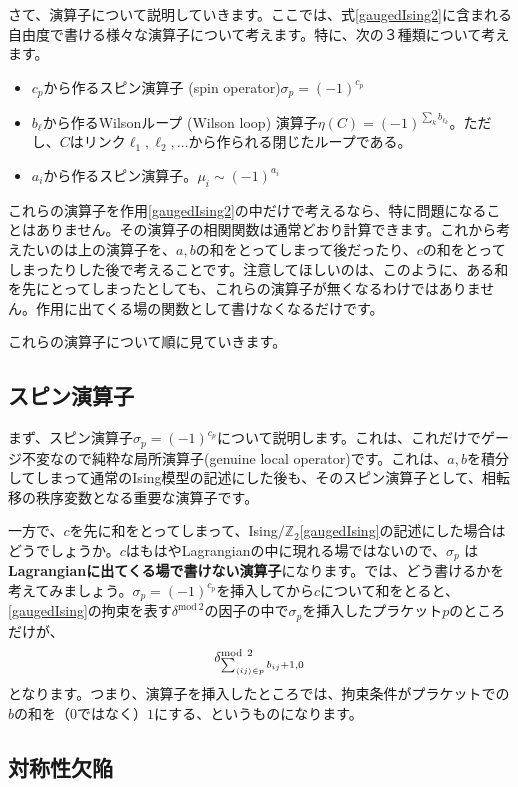 \documentclass[report,paper=a4, fontsize=12pt, line_length=16cm, number_of_lines=33,dvipdfmx]{jlreq}
\newcommand{\kyou}[1]{{\sffamily \bfseries #1}}
\numberwithin{equation}{chapter}
\newcommand{\Zb}{\mathbb{Z}}
\newcommand{\deltamod}[1]{\delta^{\mathrm{mod} \ 2}_{#1}}
\newcommand{\link}[1]{\expval{#1}}
\newcommand{\gIsing}{\mbox{Ising$/\Zb_2$}}
\begin{document}
さて、演算子について説明していきます。ここでは、式\eqref{gaugedIsing2}に含まれる自由度で書ける様々な演算子について考えます。特に、次の３種類について考えます。
\begin{itemize}
  \item $c_p$から作るスピン演算子 (spin operator)$\sigma_{p}=(-1)^{c_p}$
  \item $b_{\ell}$から作るWilsonループ (Wilson loop) 演算子$\eta(C)=(-1)^{\sum_{k}b_{\ell_k}}$。ただし、$C$はリンク$\ell_1,\ell_2,\dots$から作られる閉じたループである。
  \item $a_i$から作るスピン演算子。$\mu_{i}\sim (-1)^{a_i}$
\end{itemize}
これらの演算子を作用\eqref{gaugedIsing2}の中だけで考えるなら、特に問題になることはありません。その演算子の相関関数は通常どおり計算できます。これから考えたいのは上の演算子を、$a,b$の和をとってしまって後だったり、$c$の和をとってしまったりした後で考えることです。注意してほしいのは、このように、ある和を先にとってしまったとしても、これらの演算子が無くなるわけではありません。作用に出てくる場の関数として書けなくなるだけです。

これらの演算子について順に見ていきます。

\subsection{スピン演算子}
まず、スピン演算子$\sigma_{p}=(-1)^{c_p}$について説明します。これは、これだけでゲージ不変なので純粋な局所演算子(genuine local operator)です。これは、$a,b$を積分してしまって通常のIsing模型の記述にした後も、そのスピン演算子として、相転移の秩序変数となる重要な演算子です。

一方で、$c$を先に和をとってしまって、\gIsing \eqref{gaugedIsing}の記述にした場合はどうでしょうか。$c$はもはやLagrangianの中に現れる場ではないので、$\sigma_p$ は\kyou{Lagrangianに出てくる場で書けない演算子}になります。では、どう書けるかを考えてみましょう。$\sigma_p=(-1)^{c_p}$を挿入してから$c$について和をとると、\eqref{gaugedIsing}の拘束を表す$\deltamod{}$の因子の中で$\sigma_p$を挿入したプラケット$p$のところだけが、
\begin{align}
  \deltamod{\sum_{\link{ij} \in p}b_{ij}+1,0}
\end{align}
となります。つまり、演算子を挿入したところでは、拘束条件がプラケットでの$b$の和を（$0$ではなく）$1$にする、というものになります。

\subsection{対称性欠陥}
\end{document}
